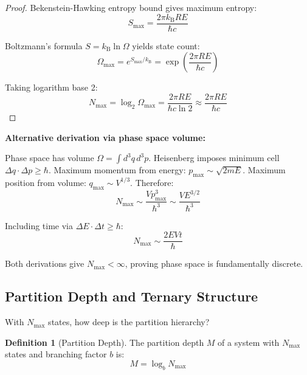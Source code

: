 \documentclass[twocolumn,10pt]{revtex4-2}
\theoremstyle{definition}
\newtheorem{definition}[theorem]{Definition}
\theoremstyle{remark}
\newcommand{\kB}{k_{\mathrm{B}}}
\newcommand{\Nmax}{N_{\max}}
\begin{document}
\begin{proof}
Bekenstein-Hawking entropy bound \cite{Bekenstein1973} gives maximum entropy:
\begin{equation}
S_{\max} = \frac{2\pi \kB RE}{\hbar c}
\end{equation}

Boltzmann's formula $S = \kB \ln \Omega$ yields state count:
\begin{equation}
\Omega_{\max} = e^{S_{\max}/\kB} = \exp\left(\frac{2\pi RE}{\hbar c}\right)
\end{equation}

Taking logarithm base 2:
\begin{equation}
\Nmax = \log_2 \Omega_{\max} = \frac{2\pi RE}{\hbar c \ln 2} \approx \frac{2\pi RE}{\hbar c}
\end{equation}
\end{proof}

\vspace{0.2cm}
\noindent\textbf{Alternative derivation via phase space volume:}

Phase space has volume $\Omega = \int d^3q \, d^3p$. Heisenberg imposes minimum cell $\Delta q \cdot \Delta p \geq \hbar$. Maximum momentum from energy: $p_{\max} \sim \sqrt{2mE}$. Maximum position from volume: $q_{\max} \sim V^{1/3}$. Therefore:
\begin{equation}
\Nmax \sim \frac{V p_{\max}^3}{\hbar^3} \sim \frac{VE^{3/2}}{\hbar^3}
\end{equation}

Including time via $\Delta E \cdot \Delta t \geq \hbar$:
\begin{equation}
\Nmax \sim \frac{2EVt}{\hbar}
\label{eq:phase_space_bound}
\end{equation}

Both derivations give $\Nmax < \infty$, proving phase space is fundamentally discrete.

\subsection{Partition Depth and Ternary Structure}

With $\Nmax$ states, how deep is the partition hierarchy?

\begin{definition}[Partition Depth]
\label{def:partition_depth}
The partition depth $M$ of a system with $\Nmax$ states and branching factor $b$ is:
\begin{equation}
M = \log_b \Nmax
\label{eq:partition_depth}
\end{equation}
\end{definition}
\end{document}
